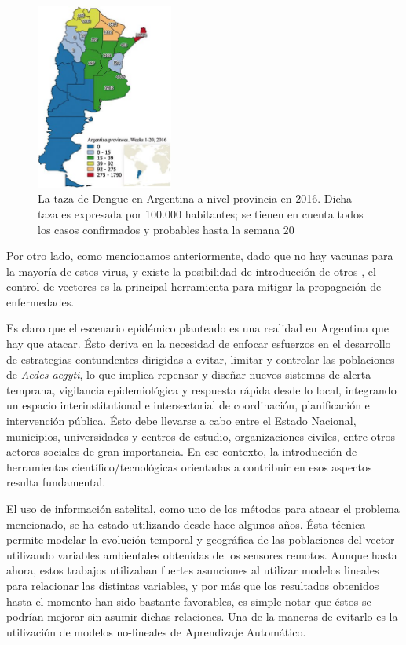     \begin{figure}
    \centering%
    \includegraphics[width=0.4\textwidth]{images/dengue}%
    \caption{La taza de Dengue en Argentina a nivel provincia en 2016.
            Dicha taza es expresada por 100.000 habitantes; se tienen en cuenta
            todos los casos confirmados y probables hasta la semana 20}\label{fig:dengue}
    \end{figure}

  \par Por otro lado, como mencionamos anteriormente, dado que no hay vacunas para la
    mayoría de estos virus, y existe la posibilidad de introducción de otros \cite{emergencia_viral},
    el control de vectores es la principal herramienta para mitigar la
    propagación de enfermedades.


  \par Es claro que el escenario epidémico planteado es una realidad en Argentina
    que hay que atacar. Ésto deriva en la necesidad de enfocar esfuerzos en el
    desarrollo de estrategias contundentes dirigidas a evitar, limitar y controlar
    las poblaciones de \textit{Aedes aegyti}, lo que implica repensar y diseñar
    nuevos sistemas de alerta temprana, vigilancia epidemiológica y respuesta
    rápida desde lo local, integrando un espacio interinstitutional e
    intersectorial de coordinación, planificación e intervención pública. Ésto debe
    llevarse a cabo entre el Estado Nacional, municipios, universidades y centros
    de estudio, organizaciones civiles, entre otros actores sociales de gran importancia.
    En ese contexto, la introducción de herramientas científico/tecnológicas orientadas
    a contribuir en esos aspectos resulta fundamental.

  \par El uso de información satelital, como uno de los métodos para atacar el
    problema mencionado, se ha estado utilizando desde hace algunos años.
    Ésta técnica permite modelar la evolución temporal y geográfica de las
    poblaciones del vector utilizando variables ambientales obtenidas de los
    sensores remotos. Aunque hasta ahora, estos trabajos utilizaban fuertes asunciones
    al utilizar modelos lineales para relacionar las distintas variables, y por más
    que los resultados obtenidos hasta el momento han sido bastante
    favorables, es simple notar que éstos se podrían mejorar sin asumir dichas relaciones.
    Una de la maneras de evitarlo es la utilización de modelos no-lineales de
    Aprendizaje Automático.

